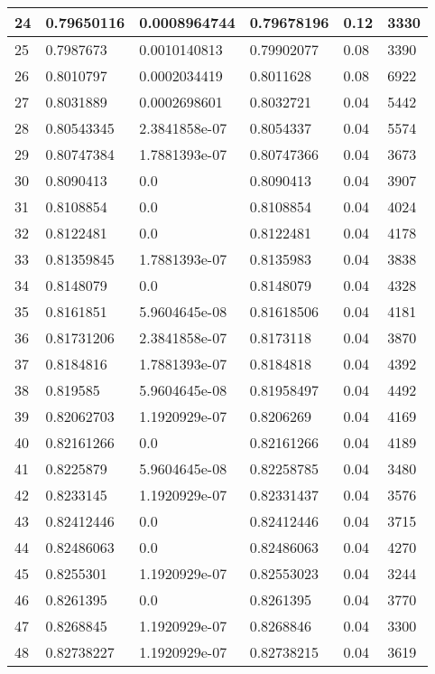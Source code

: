 \begin{longtable}{|l|l|l|l|l|l|}
24 & 0.79650116 & 0.0008964744 & 0.79678196 & 0.12 & 3330 \\ \hline 
25 & 0.7987673 & 0.0010140813 & 0.79902077 & 0.08 & 3390 \\ \hline 
26 & 0.8010797 & 0.0002034419 & 0.8011628 & 0.08 & 6922 \\ \hline 
27 & 0.8031889 & 0.0002698601 & 0.8032721 & 0.04 & 5442 \\ \hline 
28 & 0.80543345 & 2.3841858e-07 & 0.8054337 & 0.04 & 5574 \\ \hline 
29 & 0.80747384 & 1.7881393e-07 & 0.80747366 & 0.04 & 3673 \\ \hline 
30 & 0.8090413 & 0.0 & 0.8090413 & 0.04 & 3907 \\ \hline 
31 & 0.8108854 & 0.0 & 0.8108854 & 0.04 & 4024 \\ \hline 
32 & 0.8122481 & 0.0 & 0.8122481 & 0.04 & 4178 \\ \hline 
33 & 0.81359845 & 1.7881393e-07 & 0.8135983 & 0.04 & 3838 \\ \hline 
34 & 0.8148079 & 0.0 & 0.8148079 & 0.04 & 4328 \\ \hline 
35 & 0.8161851 & 5.9604645e-08 & 0.81618506 & 0.04 & 4181 \\ \hline 
36 & 0.81731206 & 2.3841858e-07 & 0.8173118 & 0.04 & 3870 \\ \hline 
37 & 0.8184816 & 1.7881393e-07 & 0.8184818 & 0.04 & 4392 \\ \hline 
38 & 0.819585 & 5.9604645e-08 & 0.81958497 & 0.04 & 4492 \\ \hline 
39 & 0.82062703 & 1.1920929e-07 & 0.8206269 & 0.04 & 4169 \\ \hline 
40 & 0.82161266 & 0.0 & 0.82161266 & 0.04 & 4189 \\ \hline 
41 & 0.8225879 & 5.9604645e-08 & 0.82258785 & 0.04 & 3480 \\ \hline 
42 & 0.8233145 & 1.1920929e-07 & 0.82331437 & 0.04 & 3576 \\ \hline 
43 & 0.82412446 & 0.0 & 0.82412446 & 0.04 & 3715 \\ \hline 
44 & 0.82486063 & 0.0 & 0.82486063 & 0.04 & 4270 \\ \hline 
45 & 0.8255301 & 1.1920929e-07 & 0.82553023 & 0.04 & 3244 \\ \hline 
46 & 0.8261395 & 0.0 & 0.8261395 & 0.04 & 3770 \\ \hline 
47 & 0.8268845 & 1.1920929e-07 & 0.8268846 & 0.04 & 3300 \\ \hline 
48 & 0.82738227 & 1.1920929e-07 & 0.82738215 & 0.04 & 3619 \\ \hline 

\end{longtable}
